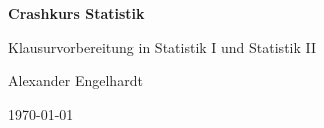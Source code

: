 \Huge{\textbf{Crashkurs Statistik}}

\huge{Klausurvorbereitung in Statistik I und Statistik II}

\vspace{5em}

\huge{Alexander Engelhardt}

\vfill

\today

\newpage

